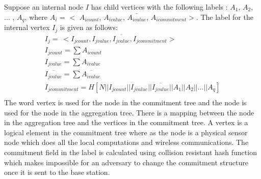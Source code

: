 	Suppose an internal node $I$ has child vertices with the following labels : $A_{1}$, $A_{2}$, $\dotsc$ , $A_{q}$, where $A_{i}$ = $<$ $A_{icount}$, $A_{ivalue}$, $\overline{A_{ivalue}}$, $A_{icommitment}$$>$. 
	The label for the internal vertex $I_{j}$ is given as follows:
	\begin{equation*}
		\begin{array}{l}
			I_{j} =\ <I_{jcount}, I_{jvalue}, \overline{I_{jvalue}}, I_{jcommitment}>\\
			I_{jcount} = \sum A_{icount}\\ 
			I_{jvalue} = \sum A_{ivalue}\\
			\overline{I_{jvalue}} = \sum \overline{A_{ivalue}}\\
			I_{jcommitment} = H[N||I_{jcount}||I_{jvalue}||\overline{I_{jvalue}}||A_{1}||A_{2}|| \dotsc ||A_{q}]\\
		\end{array}
	\end{equation*}
	The word vertex is used for the node in the commitment tree and the node is used for the node in the aggregation tree.
	There is a mapping between the node in the aggregation tree and the vertices in the commitment tree.
	A vertex is a logical element in the commitment tree where as the node is a physical sensor node which does all the local computations and wireless communications.
	The commitment field in the label is calculated using collision resistant hash function which makes impossible for an adversary to change the commitment structure once it is sent to the base station.

